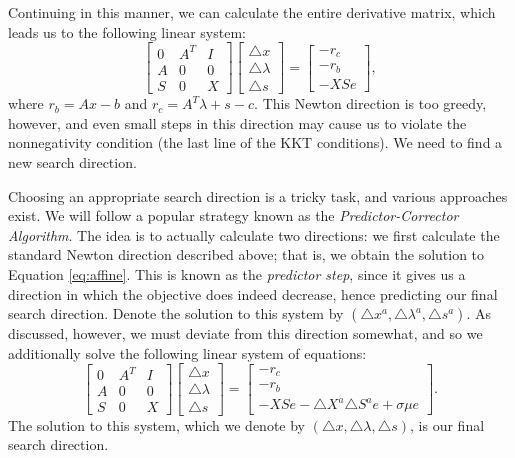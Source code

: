 Continuing in this manner, we can calculate the entire derivative matrix, which leads us to the following linear system:
\begin{equation}
\begin{bmatrix}
0 & A^T & I\\
A & 0 & 0\\
S & 0 & X
\end{bmatrix}
\begin{bmatrix}
\triangle x\\
\triangle \lambda\\
\triangle s
\end{bmatrix}
=
\begin{bmatrix}
-r_c\\
-r_b\\
-XSe
\end{bmatrix},
\label{eq:affine}
\end{equation}
where $r_b = Ax - b$ and $r_c = A^T\lambda + s - c$.
This Newton direction is too greedy, however, and even small steps in this direction may cause us to violate the nonnegativity condition (the last line of the KKT conditions).
We need to find a new search direction.

Choosing an appropriate search direction is a tricky task, and various approaches exist.
We will follow a popular strategy known as the \emph{Predictor-Corrector Algorithm}.
The idea is to actually calculate two directions: we first calculate
the standard Newton direction described above; that is, we obtain the solution to Equation \ref{eq:affine}.
This is known as the \emph{predictor step}, since it gives us a direction in which the objective does indeed decrease, hence predicting our
final search direction.
Denote the solution to this system by $(\triangle x^a, \triangle \lambda^a, \triangle s^a)$.
As discussed, however, we must deviate from this direction somewhat, and so we additionally solve the following linear system of equations:
\begin{equation}
\begin{bmatrix}
0 & A^T & I\\
A & 0 & 0\\
S & 0 & X
\end{bmatrix}
\begin{bmatrix}
\triangle x\\
\triangle \lambda\\
\triangle s
\end{bmatrix}
=
\begin{bmatrix}
-r_c\\
-r_b\\
-XSe - \triangle X^a\triangle S^ae + \sigma \mu e
\end{bmatrix}.
\label{eq:centering}
\end{equation}
The solution to this system, which we denote by $(\triangle x, \triangle \lambda, \triangle s)$, is our final search direction.

